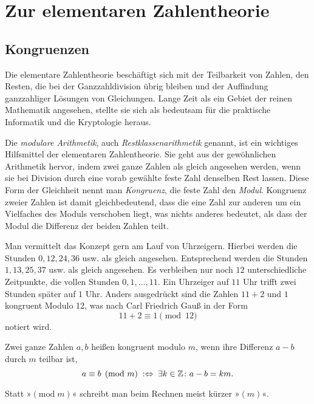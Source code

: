 \section{Zur elementaren Zahlentheorie}

\subsection{Kongruenzen}

Die elementare Zahlentheorie beschäftigt sich mit der Teilbarkeit von
Zahlen, den Resten, die bei der Ganzzahldivision übrig bleiben
und der Auffindung ganzzahliger Lösungen von Gleichungen. Lange Zeit
als ein Gebiet der reinen Mathematik angesehen, stellte sie sich
als bedeutsam für die praktische Informatik und die Kryptologie heraus. 

Die \emph{modulare Arithmetik}, auch \emph{Restklassenarithmetik}
genannt, ist ein wichtiges Hilfsmittel der elementaren Zahlentheorie.
Sie geht aus der gewöhnlichen Arithmetik hervor, indem zwei ganze
Zahlen als gleich angesehen werden, wenn sie bei Division durch eine
vorab gewählte feste Zahl denselben Rest lassen. Diese Form der
Gleichheit nennt man \emph{Kongruenz}, die feste Zahl den \emph{Modul}.
Kongruenz zweier Zahlen ist damit gleichbedeutend, dass die eine
Zahl zur anderen um ein Vielfaches des Moduls verschoben liegt, was nichts
anderes bedeutet, als dass der Modul die Differenz der beiden Zahlen teilt.

Man vermittelt das Konzept gern am Lauf von Uhrzeigern. Hierbei werden
die Stunden $0, 12, 24, 36$ usw. als gleich angesehen. Entsprechend
werden die Stunden $1, 13, 25, 37$ usw. als gleich angesehen. Es
verbleiben nur noch $12$ unterschiedliche Zeitpunkte, die vollen
Stunden $0, 1, \ldots, 11$. Ein Uhrzeiger auf $11$ Uhr trifft
zwei Stunden später auf $1$ Uhr. Anders ausgedrückt sind die Zahlen
$11+2$ und $1$ kongruent Modulo 12, was nach Carl Friedrich Gauß
in der Form
\[11 + 2\equiv 1\pmod{12}\]
notiert wird.

\begin{Definition}[Kongruenz]\newlinefirst
Zwei ganze Zahlen $a,b$ heißen kongruent modulo $m$, wenn ihre Differenz
$a-b$ durch $m$ teilbar ist,%
\[a\equiv b\pmod{m}\;:\Leftrightarrow\;\exists k\in\mathbb Z\colon a-b=km.\]
\end{Definition}
Statt »$(\mathrm{mod}\;m)$« schreibt man beim Rechnen meist
kürzer »$(m)$«.

